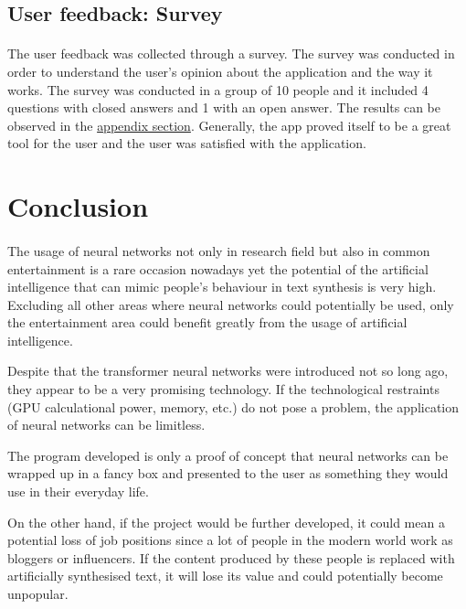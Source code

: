 \documentclass[12pt]{report}
\begin{document}
\subsection*{User feedback: Survey}
\paragraph{}
The user feedback was collected through a survey. The survey was conducted in order to understand the user's opinion about the
application and the way it works. The survey was conducted in a group of 10 people and it included 4 questions with closed answers
and 1 with an open answer. The results can be observed in the \hyperref[appendix:survey_results]{appendix section}. Generally,
the app proved itself to be a great tool for the user and the user was satisfied with the application.

\section*{Conclusion}
\paragraph{}
The usage of neural networks not only in research field but also in common entertainment is a rare occasion nowadays yet the potential of 
the artificial intelligence that can mimic people's behaviour in text synthesis is very high. Excluding all other areas where neural networks
could potentially be used, only the entertainment area could benefit greatly from the usage of artificial intelligence. 

Despite that the transformer neural networks were introduced not so long ago, they appear to be a very promising technology. If the
technological restraints (GPU calculational power, memory, etc.) do not pose a problem, the application of neural networks can be
limitless.

The program developed is only a proof of concept that neural networks can be wrapped up in a fancy box and presented to the user as something
they would use in their everyday life.

On the other hand, if the project would be further developed, it could mean a potential loss of job positions since a lot of people in the modern
world work as bloggers or influencers. If the content produced by these people is replaced with artificially synthesised text, it will lose its
value and could potentially become unpopular.
\end{document}
